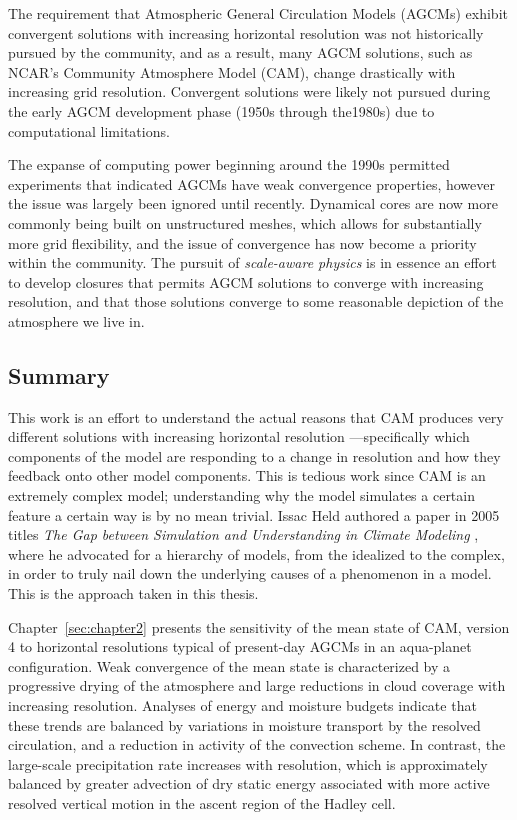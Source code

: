 The requirement that Atmospheric General Circulation Models (AGCMs) exhibit convergent solutions with increasing horizontal resolution was not historically pursued by the community, and as a result, many AGCM solutions, such as NCAR's Community Atmosphere Model (CAM), change drastically with increasing grid resolution. Convergent solutions were likely not pursued during the early AGCM development phase (1950s through the1980s) due to computational limitations. 

The expanse of computing power beginning around the 1990s permitted experiments that indicated AGCMs have weak convergence properties, however the issue was largely been ignored until recently. Dynamical cores are now more commonly being built on unstructured meshes, which allows for substantially more grid flexibility, and the issue of convergence has now become a priority within the community. The pursuit of {\em{scale-aware physics}} is in essence an effort to develop closures that permits AGCM solutions to converge with increasing resolution, and that those solutions converge to some reasonable depiction of the atmosphere we live in.

\subsection{Summary}

This work is an effort to understand the actual reasons that CAM produces very different solutions with increasing horizontal resolution ---specifically which components of the model are responding to a change in resolution and how they feedback onto other model components. This is tedious work since CAM is an extremely complex model; understanding why the model simulates a certain feature a certain way is by no mean trivial. Issac Held authored a paper in 2005 titles {\em{The Gap between Simulation and Understanding in Climate Modeling}} \citep{H2005BAMS}, where he advocated for a hierarchy of models, from the idealized to the complex, in order to truly nail down the underlying causes of a phenomenon in a model. This is the approach taken in this thesis.

Chapter~\ref{sec:chapter2} presents the sensitivity of the mean state of CAM, version 4 to horizontal resolutions typical of present-day AGCMs in an aqua-planet configuration. Weak convergence of the mean state is characterized by a progressive drying of the atmosphere and large reductions in cloud coverage with increasing resolution. Analyses of energy and moisture budgets indicate that these trends are balanced by variations in moisture transport by the resolved circulation, and a reduction in activity of the convection scheme. In contrast, the large-scale precipitation rate increases with resolution, which is approximately balanced by greater advection of dry static energy associated with more active resolved vertical motion in the ascent region of the Hadley cell.

